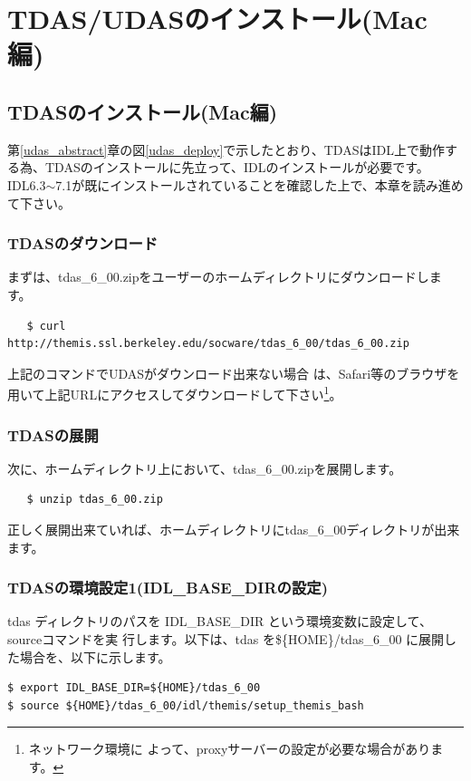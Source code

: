 \documentclass[a4j]{jbook}
\begin{document}
\part{TDAS/UDASのインストール(Mac編)}

\chapter{TDASのインストール(Mac編)}
\label{tdas_install_mac}

第\ref{udas_abstract}章の図\ref{udas_deploy}で示したとおり、TDASはIDL上で動作する為、TDASのインストールに先立って、IDLのインストールが必要です。
IDL6.3$\sim$7.1が既にインストールされていることを確認した上で、本章を読み進めて下さい。

\section{TDASのダウンロード}
まずは、tdas\_6\_00.zipをユーザーのホームディレクトリにダウンロードします。
\begin{screen}
\begin{verbatim}
   $ curl http://themis.ssl.berkeley.edu/socware/tdas_6_00/tdas_6_00.zip 
\end{verbatim}
\end{screen}
上記のコマンドでUDASがダウンロード出来ない場合
は、Safari等のブラウザを用いて上記URLにアクセスしてダウンロードして下さい\footnote{ネットワーク環境に
よって、proxyサーバーの設定が必要な場合があります。}。

\section{TDASの展開}
次に、ホームディレクトリ上において、tdas\_6\_00.zipを展開します。
\begin{screen}
\begin{verbatim}
   $ unzip tdas_6_00.zip
\end{verbatim}
\end{screen}
正しく展開出来ていれば、ホームディレクトリにtdas\_6\_00ディレクトリが出来ます。

\section{TDASの環境設定1(IDL\_BASE\_DIRの設定)}

tdas ディレクトリのパスを IDL\_BASE\_DIR という環境変数に設定して、sourceコマンドを実
行します。以下は、tdas を\$\{HOME\}/tdas\_6\_00 に展開した場合を、以下に示します。
\begin{screen}
\begin{verbatim}
$ export IDL_BASE_DIR=${HOME}/tdas_6_00
$ source ${HOME}/tdas_6_00/idl/themis/setup_themis_bash
\end{verbatim}
\end{screen}
\end{document}
